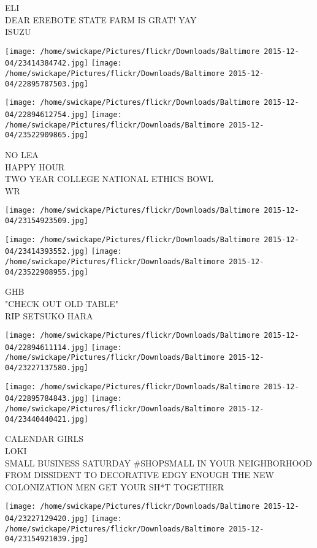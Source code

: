 \documentclass[10pt,letterpaper]{article}
\begin{document}
ELI\\
DEAR EREBOTE STATE FARM IS GRAT!  YAY\\
ISUZU
\pagebreak

\texttt{[image: /home/swickape/Pictures/flickr/Downloads/Baltimore 2015-12-04/23414384742.jpg]}
\texttt{[image: /home/swickape/Pictures/flickr/Downloads/Baltimore 2015-12-04/22895787503.jpg]}

\texttt{[image: /home/swickape/Pictures/flickr/Downloads/Baltimore 2015-12-04/22894612754.jpg]}
\texttt{[image: /home/swickape/Pictures/flickr/Downloads/Baltimore 2015-12-04/23522909865.jpg]}

NO LEA\\
HAPPY HOUR\\
TWO YEAR COLLEGE NATIONAL ETHICS BOWL\\
WR
\pagebreak

\texttt{[image: /home/swickape/Pictures/flickr/Downloads/Baltimore 2015-12-04/23154923509.jpg]}

\vspace{0.25in}
\texttt{[image: /home/swickape/Pictures/flickr/Downloads/Baltimore 2015-12-04/23414393552.jpg]}
\texttt{[image: /home/swickape/Pictures/flickr/Downloads/Baltimore 2015-12-04/23522908955.jpg]}

GHB\\
"CHECK OUT OLD TABLE"\\
RIP SETSUKO HARA
\pagebreak

\texttt{[image: /home/swickape/Pictures/flickr/Downloads/Baltimore 2015-12-04/22894611114.jpg]}
\texttt{[image: /home/swickape/Pictures/flickr/Downloads/Baltimore 2015-12-04/23227137580.jpg]}

\texttt{[image: /home/swickape/Pictures/flickr/Downloads/Baltimore 2015-12-04/22895784843.jpg]}
\texttt{[image: /home/swickape/Pictures/flickr/Downloads/Baltimore 2015-12-04/23440440421.jpg]}

CALENDAR GIRLS\\
LOKI\\
SMALL BUSINESS SATURDAY \#SHOPSMALL IN YOUR NEIGHBORHOOD\\
FROM DISSIDENT TO DECORATIVE EDGY ENOUGH THE NEW COLONIZATION MEN GET YOUR SH*T TOGETHER
\pagebreak

\texttt{[image: /home/swickape/Pictures/flickr/Downloads/Baltimore 2015-12-04/23227129420.jpg]}
\texttt{[image: /home/swickape/Pictures/flickr/Downloads/Baltimore 2015-12-04/23154921039.jpg]}
\end{document}

